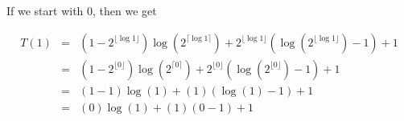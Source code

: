 \documentclass[12pt]{scrartcl}
\begin{document}
\begin{enumerate}
	If we start with 0, then we get
	
	\begin{eqnarray}
		T(1)	&	=	& \left(1 - 2^{\lfloor \log 1 \rfloor}\right) \log\left( 2^{\lceil \log 1 \rceil} \right) + 2^{\lfloor \log 1 \rfloor}\left( \log \left(2^{\lfloor \log 1 \rfloor} \right) - 1 \right) + 1 \nonumber \\
			&	=	& \left(1 - 2^{\lfloor 0 \rfloor}\right) \log\left( 2^{\lceil 0 \rceil} \right) + 2^{\lfloor 0 \rfloor}\left( \log \left(2^{\lfloor 0 \rfloor} \right) - 1 \right) + 1 \nonumber \\
			&	=	& \left(1 - 1 \right) \log\left( 1 \right) + (1)\left( \log \left(1\right) - 1 \right) + 1 \nonumber \\
			&	=	& \left(0 \right) \log\left( 1 \right) + (1)\left( 0 - 1 \right) + 1 \nonumber \\
	\end{eqnarray}
	
\end{enumerate}
\end{document}
